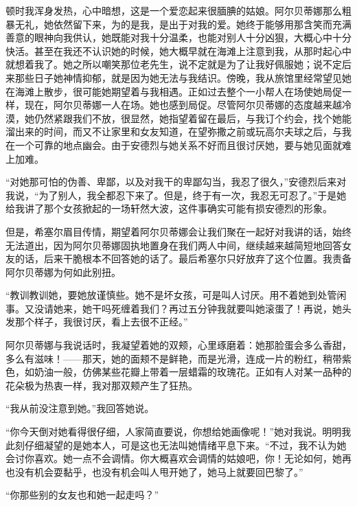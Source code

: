 \par 顿时我浑身发热，心中暗想，这是一个爱恋起来很腼腆的姑娘。阿尔贝蒂娜那么粗暴无礼，她依然留下来，为的是我，是出于对我的爱。她终于能够用那含笑而充满善意的眼神向我供认，她既能对我十分温柔，也能对别人十分凶狠，大概心中十分快活。甚至在我还不认识她的时候，她大概早就在海滩上注意到我，从那时起心中就想着我了。她之所以嘲笑那位老先生，说不定就是为了让我好佩服她；说不定后来那些日子她神情抑郁，就是因为她无法与我结识。傍晚，我从旅馆里经常望见她在海滩上散步，很可能她期望着与我相遇。正如过去整个一小帮人在场使她局促一样，现在，阿尔贝蒂娜一人在场。她也感到局促。尽管阿尔贝蒂娜的态度越来越冷漠，她仍然紧跟我们不放，很显然，她指望着留在最后，与我订个约会，找个她能溜出来的时间，而又不让家里和女友知道，在望弥撒之前或玩高尔夫球之后，与我在一个可靠的地点幽会。由于安德烈与她关系不好而且很讨厌她，要与她见面就难上加难。
\par “对她那可怕的伪善、卑鄙，以及对我干的卑鄙勾当，我忍了很久，”安德烈后来对我说，“为了别人，我全都忍下来了。但是，终于有一次，我忍无可忍了。”于是她给我讲了那个女孩掀起的一场轩然大波，这件事确实可能有损安德烈的形象。
\par 但是，希塞尔眉目传情，期望着阿尔贝蒂娜会让我们聚在一起好对我讲的话，始终无法道出，因为阿尔贝蒂娜固执地置身在我们两人中间，继续越来越简短地回答女友的话，后来干脆根本不回答她的话了。最后希塞尔只好放弃了这个位置。我责备阿尔贝蒂娜为何如此别扭。
\par “教训教训她，要她放谨慎些。她不是坏女孩，可是叫人讨厌。用不着她到处管闲事。又没请她来，她干吗死缠着我们？再过五分钟我就要叫她滚蛋了！再说，她头发那个样子，我很讨厌，看上去很不正经。”
\par 阿尔贝蒂娜与我说话时，我凝望着她的双颊，心里琢磨着：她那脸蛋会多么香甜，多么有滋味！——那天，她的面颊不是鲜艳，而是光滑，连成一片的粉红，稍带紫色，如奶油一般，仿佛某些花瓣上带着一层蜡霜的玫瑰花。正如有人对某一品种的花朵极为热衷一样，我对那双颊产生了狂热。
\par “我从前没注意到她。”我回答她说。
\par “你今天倒对她看得很仔细，人家简直要说，你想给她画像呢！”她对我说。明明我此刻仔细凝望的是她本人，可是这也无法叫她情绪平息下来。“不过，我不认为她会讨你喜欢。她一点不会调情。你大概喜欢会调情的姑娘吧，你！无论如何，她再也没有机会耍黏乎，也没有机会叫人甩开她了，她马上就要回巴黎了。”
\par “你那些别的女友也和她一起走吗？”
